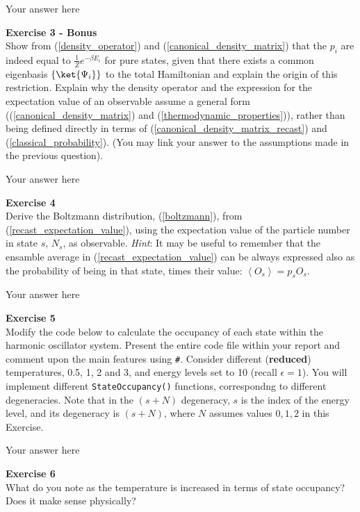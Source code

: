 \documentclass{article}
\begin{document}
Your answer here

\begin{mdframed}
\textbf{Exercise 3 - Bonus}\\
Show from (\ref{density_operator}) and (\ref{canonical_density_matrix}) that the $p_i$ are indeed equal to $\frac{1}{Z}e^{ -\beta E_i}$ for pure states, given that there exists a common eigenbasis $\left\{\ket{\Psi_i}\right\}$ to the total Hamiltonian and explain the origin of this restriction.
Explain why the density operator and the expression for the expectation value of an observable assume a general form ((\ref{canonical_density_matrix}) and (\ref{thermodynamic_properties})), rather than being defined directly in terms of (\ref{canonical_density_matrix_recast}) and (\ref{classical_probability}).
(You may link your answer to the assumptions made in the previous question).
\end{mdframed}

Your answer here

\begin{mdframed}
\textbf{Exercise 4}\\
Derive the Boltzmann distribution, (\ref{boltzmann}), from (\ref{recast_expectation_value}), using the   expectation value of the particle number in state $s$, $N_s$, as observable.
\textit{Hint}: It may be useful to remember that the ensamble average in (\ref{recast_expectation_value}) can be always expressed also as the probability of being in that state, times their value: $\left< O_s \right> = p_s O_s$.
\end{mdframed}

Your answer here

\begin{mdframed}
\textbf{Exercise 5}\\
Modify the code below to calculate the occupancy of each state within the harmonic oscillator system.
Present the entire code file within your report and comment upon the main features using \texttt{\#}.
Consider different (\textbf{reduced}) temperatures, 0.5, 1, 2 and 3, and energy levels set to 10 (recall $\epsilon = 1$).
You will implement different \texttt{StateOccupancy()} functions, correspondng to different degeneracies. Note that in the $(s + N)$ degeneracy, $s$ is
the index of the energy level, and its degeneracy is $(s + N)$, where $N$ assumes values $0,1,2$ in this Exercise.
\end{mdframed}

Your answer here

\begin{mdframed}
\textbf{Exercise 6}\\
What do you note as the temperature is increased in terms of state occupancy? Does it make sense physically?
\end{mdframed}
\end{document}
